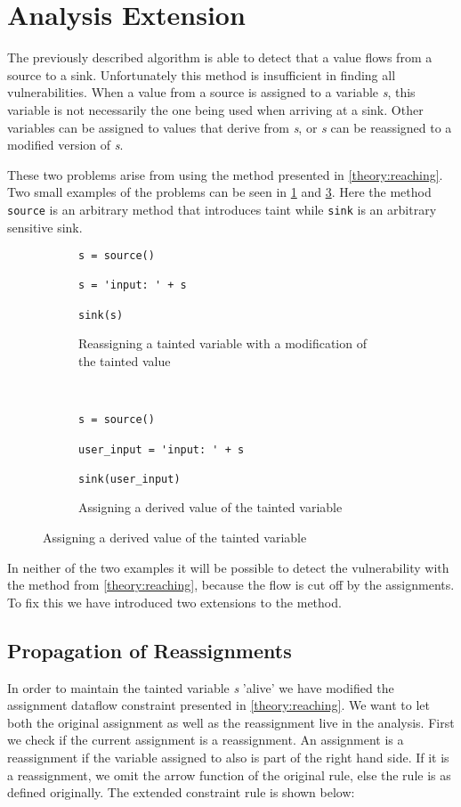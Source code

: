 \section{Analysis Extension}\label{theory:extension}
The previously described algorithm is able to detect that a value flows from a source to a sink.
Unfortunately this method is insufficient in finding all vulnerabilities.
When a value from a source is assigned to a variable \textit{s}, this variable is not necessarily the one being used when arriving at a sink.
Other variables can be assigned to values that derive from \textit{s}, or \textit{s} can be reassigned to a modified version of \textit{s}.

These two problems arise from using the method presented in \cref{theory:reaching}.
Two small examples of the problems can be seen in \cref{ext:reassign} and \cref{ext:assign}.
Here the method \texttt{source} is an arbitrary method that introduces taint while \texttt{sink} is an arbitrary sensitive sink.

\begin{figure}[h]

  \begin{subfigure}[b]{0.45\textwidth}
    \begin{lstlisting}[style=python]
s = source()

s = 'input: ' + s

sink(s)
    \end{lstlisting}
    \caption{Reassigning a tainted variable with a modification of the tainted value}
    \label{ext:reassign}
  \end{subfigure}
  ~~
  \begin{subfigure}[b]{0.45\textwidth}
    \begin{lstlisting}[style=python, numbers=none]
s = source()

user_input = 'input: ' + s

sink(user_input)
    \end{lstlisting}
    \caption{Assigning a derived value of the tainted variable}
    \label{ext:assign}
  \end{subfigure}
\end{figure}

In neither of the two examples it will be possible to detect the vulnerability with the method from \cref{theory:reaching}, because the flow is cut off by the assignments.
To fix this we have introduced two extensions to the method.

\subsection{Propagation of Reassignments}
In order to maintain the tainted variable \textit{s} 'alive' we have modified the assignment dataflow constraint presented in \cref{theory:reaching}.
We want to let both the original assignment as well as the reassignment live in the analysis.
First we check if the current assignment is a reassignment.
An assignment is a reassignment if the variable assigned to also is part of the right hand side.
If it is a reassignment, we omit the arrow function of the original rule, else the rule is as defined originally.
The extended constraint rule is shown below:

